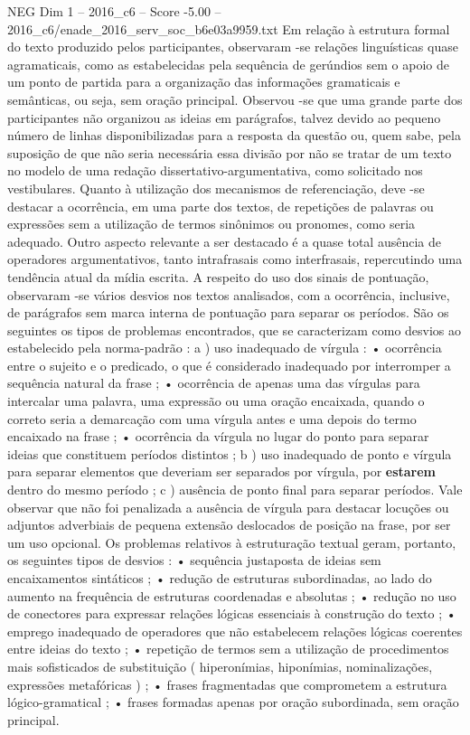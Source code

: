 \begin{textsample}{NEG Dim 1 – 2016\_c6 – Score -5.00 – 2016\_c6/enade\_2016\_serv\_soc\_b6e03a9959.txt}
Em relação à estrutura formal do texto produzido pelos participantes, observaram -se relações linguísticas quase agramaticais, como as estabelecidas pela sequência de gerúndios sem o apoio de um ponto de partida para a organização das informações gramaticais e semânticas, ou seja, sem oração principal.
Observou -se que uma grande parte dos participantes não organizou as ideias em parágrafos, talvez devido ao pequeno número de linhas disponibilizadas para a resposta da questão ou, quem sabe, pela suposição de que não seria necessária essa divisão por não se tratar de um texto no modelo de uma redação dissertativo-argumentativa, como solicitado nos vestibulares.
Quanto à utilização dos mecanismos de referenciação, deve -se destacar a ocorrência, em uma parte dos textos, de repetições de palavras ou expressões sem a utilização de termos sinônimos ou pronomes, como seria adequado.
Outro aspecto relevante a ser destacado é a quase total ausência de operadores argumentativos, tanto intrafrasais como interfrasais, repercutindo uma tendência atual da mídia escrita.
A respeito do uso dos sinais de pontuação, observaram -se vários desvios nos textos analisados, com a ocorrência, inclusive, de parágrafos sem marca interna de pontuação para separar os períodos.
São os seguintes os tipos de problemas encontrados, que se caracterizam como desvios ao estabelecido pela norma-padrão : a ) uso inadequado de vírgula : • ocorrência entre o sujeito e o predicado, o que é considerado inadequado por interromper a sequência natural da frase ; • ocorrência de apenas uma das vírgulas para intercalar uma palavra, uma expressão ou uma oração encaixada, quando o correto seria a demarcação com uma vírgula antes e uma depois do termo encaixado na frase ; • ocorrência da vírgula no lugar do ponto para separar ideias que constituem períodos distintos ; b ) uso inadequado de ponto e vírgula para separar elementos que deveriam ser separados por vírgula, por \textbf{estarem} dentro do mesmo período ; c ) ausência de ponto final para separar períodos.
Vale observar que não foi penalizada a ausência de vírgula para destacar locuções ou adjuntos adverbiais de pequena extensão deslocados de posição na frase, por ser um uso opcional.
Os problemas relativos à estruturação textual geram, portanto, os seguintes tipos de desvios : • sequência justaposta de ideias sem encaixamentos sintáticos ; • redução de estruturas subordinadas, ao lado do aumento na frequência de estruturas coordenadas e absolutas ; • redução no uso de conectores para expressar relações lógicas essenciais à construção do texto ; • emprego inadequado de operadores que não estabelecem relações lógicas coerentes entre ideias do texto ; • repetição de termos sem a utilização de procedimentos mais sofisticados de substituição ( hiperonímias, hiponímias, nominalizações, expressões metafóricas ) ; • frases fragmentadas que comprometem a estrutura lógico-gramatical ; • frases formadas apenas por oração subordinada, sem oração principal.

\end{textsample}
